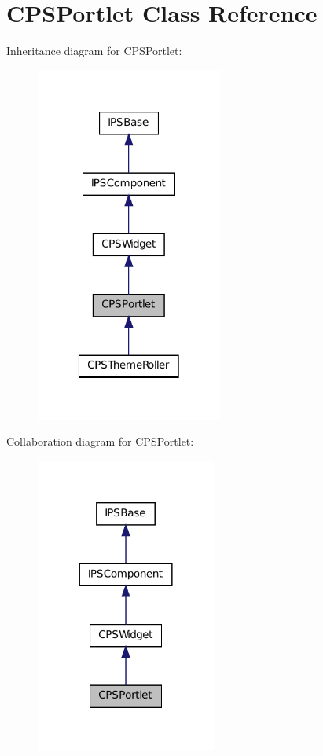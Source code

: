 \hypertarget{classCPSPortlet}{
\section{CPSPortlet Class Reference}
\label{classCPSPortlet}
}


Inheritance diagram for CPSPortlet:\nopagebreak
\begin{figure}[H]
\begin{center}
\leavevmode
\includegraphics[width=174pt]{classCPSPortlet__inherit__graph}
\end{center}
\end{figure}


Collaboration diagram for CPSPortlet:\nopagebreak
\begin{figure}[H]
\begin{center}
\leavevmode
\includegraphics[width=168pt]{classCPSPortlet__coll__graph}
\end{center}
\end{figure}
